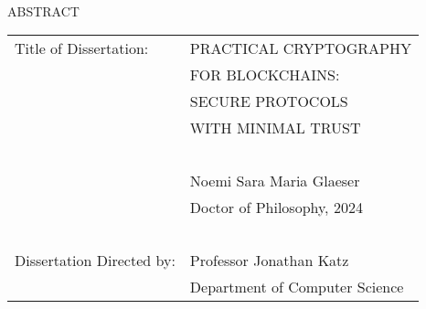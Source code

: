 \hbox{\ }

\begin{center}
\large{{ABSTRACT}}

\vspace{3em}

\end{center}
\hspace{-.15in}
\begin{tabular}{ll}
Title of Dissertation:     & {\large  PRACTICAL CRYPTOGRAPHY}\\
                           & {\large  FOR BLOCKCHAINS:} \\
                           & {\large  SECURE PROTOCOLS} \\
                           & {\large  WITH MINIMAL TRUST} \\
\                         \\
                           & {\large  Noemi Sara Maria Glaeser} \\
                           & {\large Doctor of Philosophy, 2024} \\
\                         \\
Dissertation Directed by:  & {\large  Professor Jonathan Katz} \\
                           & {\large  Department of Computer Science } \\
\end{tabular}

\vspace{3em}

\begin{doublespacing}
\par
\end{doublespacing}
